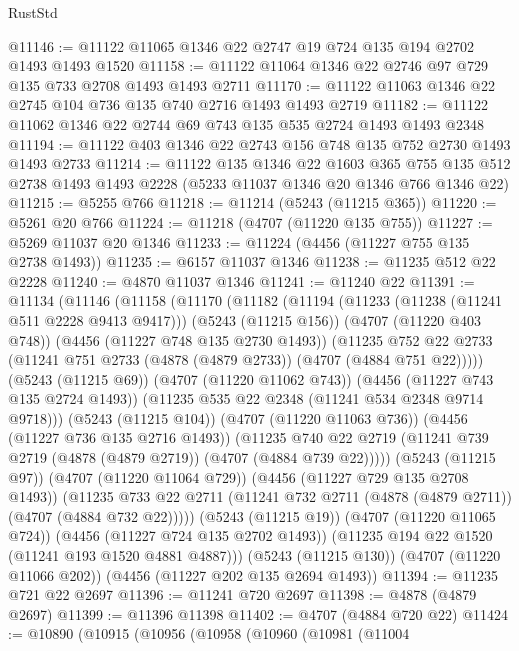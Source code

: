 \begin{lexlean}{RustStd}
\begin{coremodule}
@11146 := @11122 @11065 @1346 @22 @2747 @19 @724 @135 @194 @2702 @1493 @1493 @1520
@11158 := @11122 @11064 @1346 @22 @2746 @97 @729 @135 @733 @2708 @1493 @1493 @2711
@11170 := @11122 @11063 @1346 @22 @2745 @104 @736 @135 @740 @2716 @1493 @1493 @2719
@11182 := @11122 @11062 @1346 @22 @2744 @69 @743 @135 @535 @2724 @1493 @1493 @2348
@11194 := @11122 @403 @1346 @22 @2743 @156 @748 @135 @752 @2730 @1493 @1493 @2733
@11214 := @11122
    @135
    @1346
    @22
    @1603
    @365
    @755
    @135
    @512
    @2738
    @1493
    @1493
    @2228
    (@5233 @11037 @1346 @20 @1346 @766 @1346 @22)
@11215 := @5255 @766
@11218 := @11214 (@5243 (@11215 @365))
@11220 := @5261 @20 @766
@11224 := @11218 (@4707 (@11220 @135 @755))
@11227 := @5269 @11037 @20 @1346
@11233 := @11224 (@4456 (@11227 @755 @135 @2738 @1493))
@11235 := @6157 @11037 @1346
@11238 := @11235 @512 @22 @2228
@11240 := @4870 @11037 @1346
@11241 := @11240 @22
@11391 := @11134
    (@11146
      (@11158
        (@11170
          (@11182
            (@11194
              (@11233 (@11238 (@11241 @511 @2228 @9413 @9417)))
              (@5243 (@11215 @156))
              (@4707 (@11220 @403 @748))
              (@4456 (@11227 @748 @135 @2730 @1493))
              (@11235
                @752
                @22
                @2733
                (@11241 @751 @2733 (@4878 (@4879 @2733)) (@4707 (@4884 @751 @22)))))
            (@5243 (@11215 @69))
            (@4707 (@11220 @11062 @743))
            (@4456 (@11227 @743 @135 @2724 @1493))
            (@11235 @535 @22 @2348 (@11241 @534 @2348 @9714 @9718)))
          (@5243 (@11215 @104))
          (@4707 (@11220 @11063 @736))
          (@4456 (@11227 @736 @135 @2716 @1493))
          (@11235
            @740
            @22
            @2719
            (@11241 @739 @2719 (@4878 (@4879 @2719)) (@4707 (@4884 @739 @22)))))
        (@5243 (@11215 @97))
        (@4707 (@11220 @11064 @729))
        (@4456 (@11227 @729 @135 @2708 @1493))
        (@11235 @733 @22 @2711 (@11241 @732 @2711 (@4878 (@4879 @2711)) (@4707 (@4884 @732 @22)))))
      (@5243 (@11215 @19))
      (@4707 (@11220 @11065 @724))
      (@4456 (@11227 @724 @135 @2702 @1493))
      (@11235 @194 @22 @1520 (@11241 @193 @1520 @4881 @4887)))
    (@5243 (@11215 @130))
    (@4707 (@11220 @11066 @202))
    (@4456 (@11227 @202 @135 @2694 @1493))
@11394 := @11235 @721 @22 @2697
@11396 := @11241 @720 @2697
@11398 := @4878 (@4879 @2697)
@11399 := @11396 @11398
@11402 := @4707 (@4884 @720 @22)
@11424 := @10890
    (@10915
      (@10956
        (@10958
          (@10960
            (@10981
              (@11004

\end{coremodule}
\end{lexlean}

